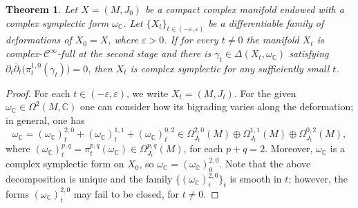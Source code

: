 \documentclass[a4paper]{amsart}
\newtheorem{theorem}{Theorem}[section]
\theoremstyle{definition}
\theoremstyle{remark}
\numberwithin{equation}{section}
\begin{document}
\begin{theorem}\label{thm:stability-2}
Let $X=(M,J_0)$ be a compact complex manifold endowed with a complex symplectic form $\omega_{\mathbb C}$. Let $\{X_t\}_{t\in(-\varepsilon,\varepsilon)}$ be a differentiable family of deformations of $X_0=X$, where $\varepsilon>0$. If for every $t\neq 0$ the manifold $X_t$ is complex-\,$\mathcal C^{\infty}$-full at the second stage and there is $\gamma_t\in\Delta(X_t,\omega_{\mathbb C})$ satisfying 
$\partial_t\bar{\partial}_t\big(\pi_t^{1,0}(\gamma_t)\big)=0$,
then $X_t$ is complex symplectic for any sufficiently small $t$.
\end{theorem}
\begin{proof}
For each $t\in(-\varepsilon,\varepsilon)$, we write $X_t=(M,J_t)$.
For the given $\omega_{\mathbb C}\in\Omega^2(M,\mathbb C)$ one can consider how its bigrading varies along the deformation; in general, one has
\begin{equation}\label{expression1}
\omega_{\mathbb C}=( \omega_{\mathbb C} )_t^{2,0}
	+( \omega_{\mathbb C} )_t^{1,1}
	+( \omega_{\mathbb C} )_t^{0,2}
	\in\Omega^{2,0}_{J_t}(M)\oplus \Omega^{1,1}_{J_t}(M)\oplus\Omega^{0,2}_{J_t}(M),
\end{equation}
where $( \omega_{\mathbb C} )_t^{p,q}=\pi^{p,q}_t(\omega_{\mathbb C})\in \Omega^{p,q}_{J_t}(M)$,
for each $p+q=2$. Moreover, $\omega_{\mathbb C}$ is a complex symplectic form on $X_0$, so
$\omega_{\mathbb C}=( \omega_{\mathbb C} )_0^{2,0}$. %
Note that the above decomposition is unique and the
family $\big\{ ( \omega_{\mathbb C} )_t^{2,0} \big\}_t$ is smooth in $t$; however, the forms $( \omega_{\mathbb C} )_t^{2,0}$ may fail to be closed, for $t\neq 0$.


\end{proof}
\end{document}
